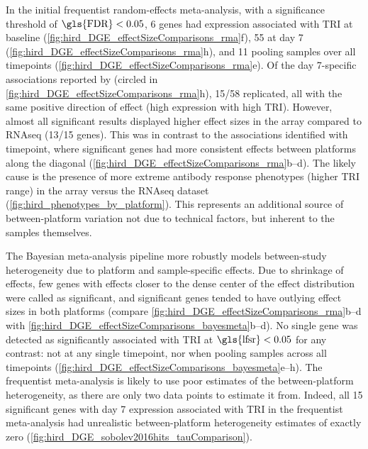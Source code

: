 In the initial frequentist random-effects meta-analysis,
with a significance threshold of $\text{\gls{FDR}} < 0.05$, 6 genes had expression associated with \gls{TRI} at baseline (\cref{fig:hird_DGE_effectSizeComparisons_rma}f), 55 at day 7 (\cref{fig:hird_DGE_effectSizeComparisons_rma}h), and 11 pooling samples over all timepoints (\cref{fig:hird_DGE_effectSizeComparisons_rma}e).
Of the day 7-specific associations reported by \textcite{sobolev2016AdjuvantedInfluenzaH1N1Vaccination} (circled in \cref{fig:hird_DGE_effectSizeComparisons_rma}h), 
15/58 replicated, all with the same positive direction of effect (high expression with high \gls{TRI}).
However, almost all significant results displayed higher effect sizes in the array compared to \gls{RNAseq} (13/15 genes).
This was in contrast to the associations identified with timepoint, where significant genes had more consistent effects between platforms along the diagonal (\cref{fig:hird_DGE_effectSizeComparisons_rma}b--d).
The likely cause is the presence of more extreme antibody response phenotypes (higher \gls{TRI} range) in the array versus the \gls{RNAseq} dataset (\cref{fig:hird_phenotypes_by_platform}).
This represents an additional source of between-platform variation not due to technical factors, but inherent to the samples themselves.

The Bayesian meta-analysis pipeline more robustly models between-study heterogeneity due to platform and sample-specific effects. 
Due to shrinkage of effects, few genes with effects closer to the dense center of the effect distribution were called as significant, and significant genes tended to have outlying effect sizes in both platforms (compare \cref{fig:hird_DGE_effectSizeComparisons_rma}b--d with \cref{fig:hird_DGE_effectSizeComparisons_bayesmeta}b--d).
No single gene was detected as significantly associated with \gls{TRI} at $\text{\gls{lfsr}} < 0.05$ for any contrast:
not at any single timepoint, nor when pooling samples across all timepoints (\cref{fig:hird_DGE_effectSizeComparisons_bayesmeta}e--h).
The frequentist meta-analysis is likely to use poor estimates of the between-platform heterogeneity, as there are only two data points to estimate it from.
Indeed, all 15 significant genes with day 7 expression associated with \gls{TRI} in the frequentist meta-analysis
had unrealistic between-platform heterogeneity estimates of exactly zero (\cref{fig:hird_DGE_sobolev2016hits_tauComparison}).

